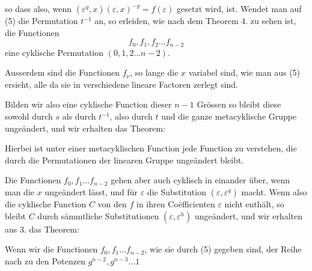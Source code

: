 so dass also, wenn $(\varepsilon^{g}, x)(\varepsilon, x)^{-g} = f(\varepsilon)$ gesetzt wird,
ist. Wendet man auf (5) die Permutation $t^{-1}$ an, so erleiden, wie nach dem Theorem 4. zu sehen ist, die Functionen
\[
f_0, f_1, f_2 \ldots f_{n-2}
\]
eine cyklische Permutation $(0, 1, 2 \ldots n-2)$.

Ausserdem sind die Functionen $f_\nu$, so lange die $x$ variabel sind, wie man aus (5) ersieht, alle  da sie in verschiedene lineare Factoren zerlegt sind.

Bilden wir also eine cyklische Function dieser $n-1$ Grössen
so bleibt diese sowohl durch $s$ als durch $t^{-1}$, also durch $t$ und die ganze metacyklische Gruppe ungeändert, und wir erhalten das Theorem:


Hierbei ist unter einer metacyklischen Function jede Function zu verstehen, die durch die Permutationen der linearen Gruppe ungeändert bleibt.

Die Functionen $f_0, f_1 \ldots f_{n-2}$ gehen aber auch cyklisch in einander über, wenn man die $x$ ungeändert lässt, und für $\varepsilon$ die Substitution $(\varepsilon, \varepsilon^g)$ macht. Wenn also die cyklische Function $C$ von den $f$ in ihren Coëfficienten $\varepsilon$ nicht enthält, so bleibt $C$ durch sämmtliche Substitutionen $(\varepsilon, \varepsilon^h)$ ungeändert, und wir erhalten aus 3. das Theorem:


Wenn wir die Functionen $f_0, f_1 \ldots f_{n-2}$, wie sie durch (5) gegeben sind, der Reihe nach zu den Potenzen $g^{n-2}, g^{n-3} \ldots 1$
